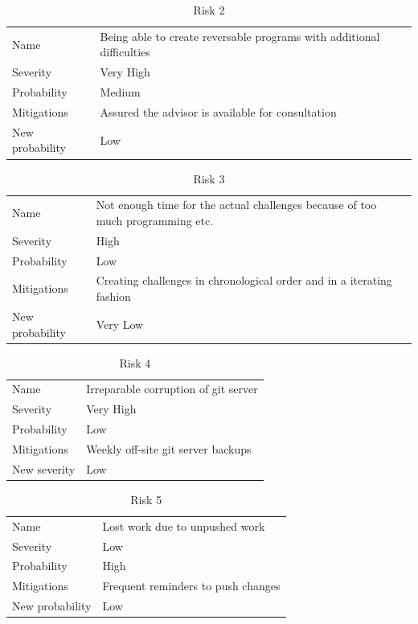 \begin{table}
  \centering
  \caption{Risk 2}
  \begin{tabular}{ll}
    Name            & Being able to create reversable programs with additional difficulties           \\
    Severity        & Very High                                 \\
    Probability     & Medium                                   \\
    Mitigations     & Assured the advisor is available for consultation  \\
    New probability & Low                                   
  \end{tabular}
\end{table}

\begin{table}
  \centering
  \caption{Risk 3}
  \begin{tabular}{ll}
    Name            & Not enough time for the actual challenges because of too much programming etc.           \\
    Severity        & High                                 \\
    Probability     & Low                                   \\
    Mitigations     & Creating challenges in chronological order and in a iterating fashion  \\
    New probability & Very Low                                   
  \end{tabular}
\end{table}

\begin{table}
  \centering
  \caption{Risk 4}
  \begin{tabular}{ll}
    Name            & Irreparable corruption of git server           \\
    Severity        & Very High                                 \\
    Probability     & Low                                   \\
    Mitigations     & Weekly off-site git server backups  \\
    New severity    & Low                                   
  \end{tabular}
\end{table}

\begin{table}
  \centering
  \caption{Risk 5}
  \begin{tabular}{ll}
    Name            & Lost work due to unpushed work           \\
    Severity        & Low                                 \\
    Probability     & High                                   \\
    Mitigations     & Frequent reminders to push changes  \\
    New probability & Low                                   
  \end{tabular}
\end{table}

